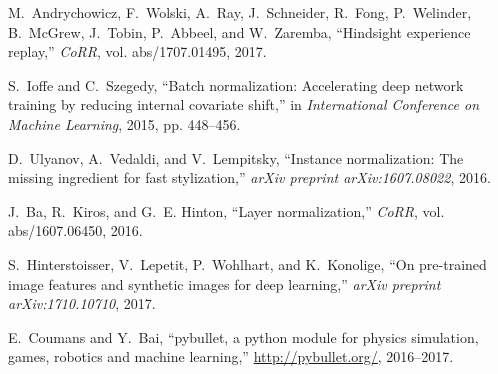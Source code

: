 \documentclass[letterpaper, 10 pt, conference]{ieeeconf}  %
\begin{document}
\begin{thebibliography}{10}
M.~Andrychowicz, F.~Wolski, A.~Ray, J.~Schneider, R.~Fong, P.~Welinder,
  B.~McGrew, J.~Tobin, P.~Abbeel, and W.~Zaremba, ``Hindsight experience
  replay,'' \emph{CoRR}, vol. abs/1707.01495, 2017.

S.~Ioffe and C.~Szegedy, ``Batch normalization: Accelerating deep network
  training by reducing internal covariate shift,'' in \emph{International
  Conference on Machine Learning}, 2015, pp. 448--456.

D.~Ulyanov, A.~Vedaldi, and V.~Lempitsky, ``Instance normalization: The missing
  ingredient for fast stylization,'' \emph{arXiv preprint arXiv:1607.08022},
  2016.

J.~Ba, R.~Kiros, and G.~E. Hinton, ``Layer normalization,'' \emph{CoRR}, vol.
  abs/1607.06450, 2016.

S.~Hinterstoisser, V.~Lepetit, P.~Wohlhart, and K.~Konolige, ``On pre-trained
  image features and synthetic images for deep learning,'' \emph{arXiv preprint
  arXiv:1710.10710}, 2017.

E.~Coumans and Y.~Bai, ``pybullet, a python module for physics simulation,
  games, robotics and machine learning,'' \url{http://pybullet.org/},
  2016--2017.

\end{thebibliography}
\end{document}
